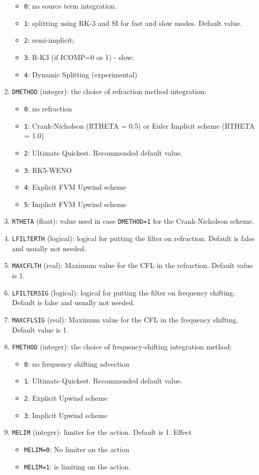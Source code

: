 \documentclass[12pt]{amsart}
\begin{document}
\begin{enumerate}
  \begin{itemize}
  \item {\tt 0}: no source term integration.
  \item {\tt 1}: splitting using RK-3 and SI for fast and slow modes. Default value.
  \item {\tt 2}: semi-implicit;
  \item {\tt 3}: R-K3 (if ICOMP=0 or 1) - slow;
  \item {\tt 4}: Dynamic Splitting (experimental)
  \end{itemize}
\item {\tt DMETHOD} (integer): the choice of refraction method integration:
  \begin{itemize}
  \item {\tt 0}: no refraction
  \item {\tt 1}: Crank-Nicholson (RTHETA = 0.5) or Euler Implicit scheme (RTHETA = 1.0)
  \item {\tt 2}: Ultimate Quickest. Recommended default value.
  \item {\tt 3}: RK5-WENO
  \item {\tt 4}: Explicit FVM Upwind scheme
  \item {\tt 5}: Implicit FVM Upwind scheme
  \end{itemize}
\item {\tt RTHETA} (float): value used in case {\tt DMETHOD=1} for the Crank-Nicholson scheme.
\item {\tt LFILTERTH} (logical): logical for putting the filter on refraction. Default is false and usually not needed.
\item {\tt MAXCFLTH} (real): Maximum value for the CFL in the refraction. Default value is 1.
\item {\tt LFILTERSIG} (logical): logical for putting the filter on frequency shifting. Default is false and usually not needed.
\item {\tt MAXCFLSIG} (real): Maximum value for the CFL in the frequency shifting. Default value is 1.
\item {\tt FMETHOD} (integer): the choice of frequency-shifting integration method:
  \begin{itemize}
  \item {\tt 0}: no frequency shifting advection
  \item {\tt 1}: Ultimate Quickest. Recommended default value.
  \item {\tt 2}: Explicit Upwind scheme
  \item {\tt 3}: Implicit Upwind scheme
  \end{itemize}
\item {\tt MELIM} (integer): limiter for the action. Default is 1. Effect
  \begin{itemize}
  \item {\tt MELIM=0}: No limiter on the action
  \item {\tt MELIM=1}: is limiting on the action. 
  \end{itemize}


\end{enumerate}
\end{document}
